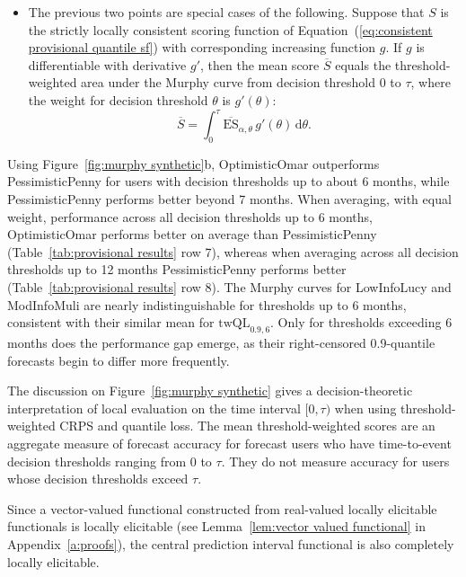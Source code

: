 \documentclass[10pt]{article} %
\theoremstyle{theorem}
\theoremstyle{definition}
\newcommand{\dd}{\mathrm{d}}
\newcommand{\twQL}{\mathrm{twQL}}
\newcommand{\ES}{\mathrm{ES}}
\begin{document}
\begin{itemize}
\[\overline{\twQL}_{\alpha,\tau} = \int_0^\tau \overline{\ES}_{\alpha,\theta}\,\dd\theta.\]
\item The previous two points are special cases of the following. Suppose that $S$ is the strictly locally consistent scoring function of Equation~(\ref{eq:consistent provisional quantile sf}) with corresponding increasing function $g$. If $g$ is differentiable with derivative $g'$, then the mean score $\overline{S}$ equals the threshold-weighted area under the Murphy curve from decision threshold 0 to $\tau$, where the weight for decision threshold $\theta$ is $g'(\theta)$:
\[\overline{S} = \int_0^\tau \overline{\ES}_{\alpha,\theta}\,g'(\theta)\,\dd\theta.\]
\end{itemize}
Using Figure~\ref{fig:murphy synthetic}b, OptimisticOmar outperforms PessimisticPenny for users with decision thresholds up to about 6 months, while PessimisticPenny performs better beyond 7 months. When averaging, with equal weight, performance across all decision thresholds up to 6 months, OptimisticOmar performs better on average than PessimisticPenny (Table~\ref{tab:provisional results} row 7), whereas when averaging across all decision thresholds up to 12 months PessimisticPenny performs better (Table~\ref{tab:provisional results} row 8). The Murphy curves for LowInfoLucy and ModInfoMuli are nearly indistinguishable for thresholds up to 6 months, consistent with their similar mean for $\twQL_{0.9,6}$. Only for thresholds exceeding 6 months does the performance gap emerge, as their right-censored 0.9-quantile forecasts begin to differ more frequently.

The discussion on Figure~\ref{fig:murphy synthetic} gives a decision-theoretic interpretation of local evaluation on the time interval $[0,\tau)$ when using threshold-weighted CRPS and quantile loss. The mean threshold-weighted scores are an aggregate measure of forecast accuracy for forecast users who have time-to-event decision thresholds ranging from $0$ to $\tau$. They do not measure accuracy for users whose decision thresholds exceed $\tau$.

Since a vector-valued functional constructed from real-valued locally elicitable functionals is locally elicitable (see Lemma~\ref{lem:vector valued functional} in Appendix~\ref{a:proofs}), the central prediction interval functional is also completely locally elicitable.
\end{document}
